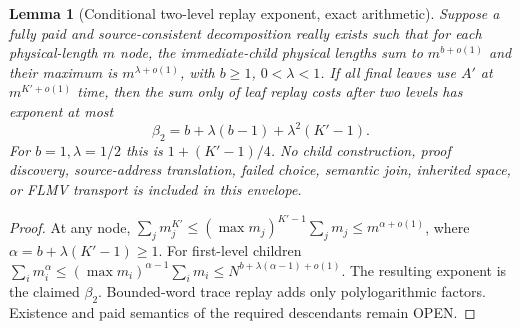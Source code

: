 \documentclass[11pt]{article}
\newtheorem{lemma}[theorem]{Lemma}
\begin{document}
\begin{lemma}[Conditional two-level replay exponent, exact arithmetic]\label{lem:weight}
Suppose a fully paid and source-consistent decomposition really exists such that for \emph{each} physical-length $m$ node, the immediate-child physical lengths sum to $m^{b+o(1)}$ and their maximum is $m^{\lambda+o(1)}$, with $b\ge1$, $0<\lambda<1$. If all final leaves use $A'$ at $m^{K'+o(1)}$ time, then the \emph{sum only of leaf replay costs} after two levels has exponent at most
\[
\beta_2=b+\lambda(b-1)+\lambda^2(K'-1).
\]
For $b=1,\lambda=1/2$ this is $1+(K'-1)/4$. No child construction, proof discovery, source-address translation, failed choice, semantic join, inherited space, or FLMV transport is included in this envelope.
\end{lemma}
\begin{proof}
At any node, $\sum_jm_j^{K'}\le(\max m_j)^{K'-1}\sum_jm_j\le m^{\alpha+o(1)}$, where $\alpha=b+\lambda(K'-1)\ge1$. For first-level children $\sum_i m_i^\alpha\le (\max m_i)^{\alpha-1}\sum_i m_i \le N^{b+\lambda(\alpha-1)+o(1)}$. The resulting exponent is the claimed $\beta_2$. Bounded-word trace replay adds only polylogarithmic factors. Existence and paid semantics of the required descendants remain OPEN.
\end{proof}
\end{document}
